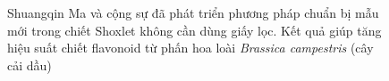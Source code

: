 \documentclass[
  twocolumn,
  landscape]{report}
\begin{document}
\begin{figure}


\caption{\label{fig-sohxletShu}Shuangqin Ma và cộng sự đã phát triển
phương pháp chuẩn bị mẫu mới trong chiết Shoxlet không cần dùng giấy
lọc. Kết quả giúp tăng hiệu suất chiết flavonoid từ phấn hoa loài
\emph{Brassica campestris} (cây cải dầu)}

\end{figure}%
\end{document}
